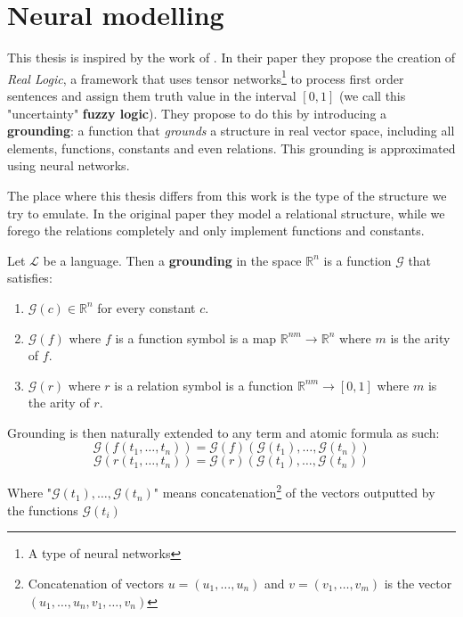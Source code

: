 \chapter{Neural modelling}

\label{chapter:implementation}
This thesis is inspired by the work of \cite{serafini}. In their paper they propose the creation of \textit{Real Logic}, a framework that uses tensor networks\footnote{A type of neural networks} to process first order sentences and assign them truth value in the interval $[0,1]$ (we call this "uncertainty" \textbf{fuzzy logic}). They propose to do this by introducing a \textbf{grounding}: a function that \textit{grounds} a structure in real vector space, including all elements, functions, constants and even relations. This grounding is approximated using neural networks. 

The place where this thesis differs from this work is the type of the structure we try to emulate. In the original paper they model a relational structure, while we forego the relations completely and only implement functions and constants.

\begin{defn}
\label{def:grounding}
	Let $\mathcal{L}$ be a language. Then a \textbf{grounding} in the space $\mathbb{R}^n$ is a function $\mathcal{G}$ that satisfies:
	\begin{enumerate}
		\item $\mathcal{G}(c)\in \mathbb{R}^n$ for every constant $c$.
		\item $\mathcal{G}(f)$ where $f$ is a function symbol is a map $\mathbb{R}^{nm}\rightarrow \mathbb{R}^n$ where $m$ is the arity of $f$.
		\item $\mathcal{G}(r)$ where $r$ is a relation symbol is a function $\mathbb{R}^{nm}\rightarrow [0,1]$ where $m$ is the arity of $r$.
	\end{enumerate}
\end{defn}

Grounding is then naturally extended to any term and atomic formula as such:
$$\mathcal{G}(f(t_1,\dots,t_n))=\mathcal{G}(f)(\mathcal{G}(t_1),\dots,\mathcal{G}(t_n))$$
$$\mathcal{G}(r(t_1,\dots,t_n))=\mathcal{G}(r)(\mathcal{G}(t_1),\dots,\mathcal{G}(t_n))$$

Where "$\mathcal{G}(t_1),\dots,\mathcal{G}(t_n)$" means concatenation\footnote{Concatenation of vectors $u=(u_1,\dots,u_n)$ and $v=(v_1,\dots,v_m)$ is the vector $(u_1,\dots,u_n,v_1,\dots,v_n)$} of the vectors outputted by the functions $\mathcal{G}(t_i)$

